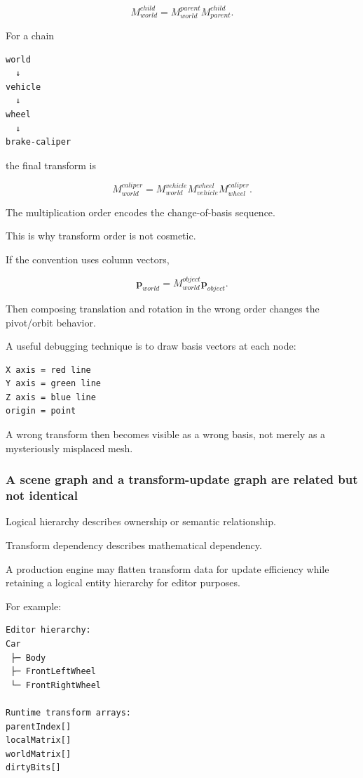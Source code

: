 \[
M_{world}^{child}
=
M_{world}^{parent}
M_{parent}^{child}.
\]

For a chain

\begin{verbatim}
world
  ↓
vehicle
  ↓
wheel
  ↓
brake-caliper
\end{verbatim}

the final transform is

\[
M_{world}^{caliper}
=
M_{world}^{vehicle}
M_{vehicle}^{wheel}
M_{wheel}^{caliper}.
\]

The multiplication order encodes the change-of-basis sequence.

This is why transform order is not cosmetic.

If the convention uses column vectors,

\[
\mathbf p_{world}
=
M_{world}^{object}
\mathbf p_{object}.
\]

Then composing translation and rotation in the wrong order changes the pivot/orbit behavior.

A useful debugging technique is to draw basis vectors at each node:

\begin{verbatim}
X axis = red line
Y axis = green line
Z axis = blue line
origin = point
\end{verbatim}

A wrong transform then becomes visible as a wrong basis, not merely as a mysteriously misplaced mesh.

\subsubsection{A scene graph and a transform-update graph are related but not identical}\label{03-visual-computing-i-ch001-a-scene-graph-and-a-transform-update-graph-are-related-but-not-identical}

Logical hierarchy describes ownership or semantic relationship.

Transform dependency describes mathematical dependency.

A production engine may flatten transform data for update efficiency while retaining a logical entity hierarchy for editor purposes.

For example:

\begin{verbatim}
Editor hierarchy:
Car
 ├─ Body
 ├─ FrontLeftWheel
 └─ FrontRightWheel

Runtime transform arrays:
parentIndex[]
localMatrix[]
worldMatrix[]
dirtyBits[]
\end{verbatim}

